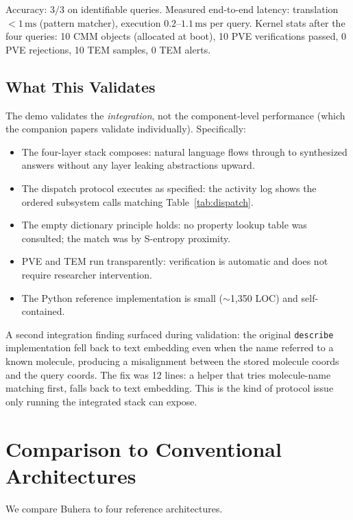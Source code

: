 \documentclass[11pt,twocolumn,a4paper]{article}
\begin{document}
Accuracy: $3/3$ on identifiable queries. Measured end-to-end latency: translation $< 1\,\text{ms}$ (pattern matcher), execution $0.2$--$1.1\,\text{ms}$ per query. Kernel stats after the four queries: 10 CMM objects (allocated at boot), 10 PVE verifications passed, 0 PVE rejections, 10 TEM samples, 0 TEM alerts.

\subsection{What This Validates}

The demo validates the \emph{integration}, not the component-level performance (which the companion papers validate individually). Specifically:

\begin{itemize}[leftmargin=*]
\item The four-layer stack composes: natural language flows through to synthesized answers without any layer leaking abstractions upward.
\item The dispatch protocol executes as specified: the activity log shows the ordered subsystem calls matching Table~\ref{tab:dispatch}.
\item The empty dictionary principle holds: no property lookup table was consulted; the match was by S-entropy proximity.
\item PVE and TEM run transparently: verification is automatic and does not require researcher intervention.
\item The Python reference implementation is small ($\sim$1,350 LOC) and self-contained.
\end{itemize}

A second integration finding surfaced during validation: the original \texttt{describe} implementation fell back to text embedding even when the name referred to a known molecule, producing a misalignment between the stored molecule coords and the query coords. The fix was 12 lines: a helper that tries molecule-name matching first, falls back to text embedding. This is the kind of protocol issue only running the integrated stack can expose.


\section{Comparison to Conventional Architectures}
\label{sec:comparison}

We compare Buhera to four reference architectures.
\end{document}
